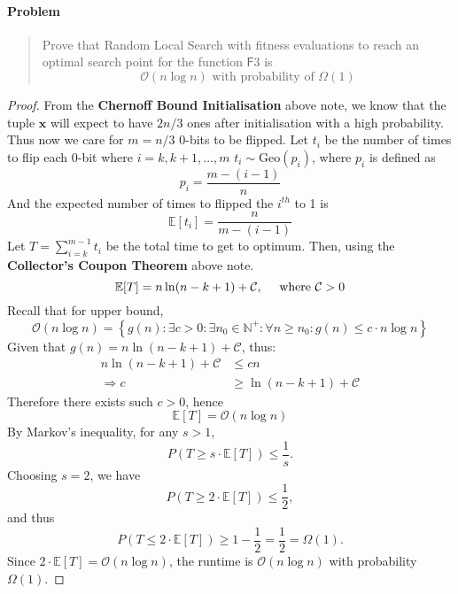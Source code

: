 \documentclass[a4paper, 12pt]{article}
\begin{document}
\paragraph{Problem}
    \begin{quote}
        Prove that Random Local Search with fitness evaluations to reach an optimal search point for the function $\mathsf{F}$3 is 
        \[
            \mathcal{O}(n\log n)
            \text{ with probability of }
            \Omega(1)
        \]
    \end{quote}
\begin{proof}
    From the \textbf{Chernoff Bound Initialisation} above note, we know that the tuple $\mathbf{x}$ will expect to have $2n/3$ ones after initialisation
    with a high probability. Thus now we care for $m = n/3$ 0-bits to be flipped. Let $t_i$ be the number of times to flip each 0-bit where $i = k,k+1,\ldots,m$
    $t_i\sim\text{Geo}(p_i)$, where $p_i$ is defined as
    \begin{equation*}
        p_i = \frac{m - (i-1)}{n}
    \end{equation*}
    And the expected number of times to flipped the $i^{th}$ to 1 is 
    \begin{equation*}
        \mathbb{E}[t_i] = \frac{n}{m - (i-1)}
    \end{equation*}
    Let $T = \sum_{i=k}^{m-1}t_i$ be the total time to get to optimum. Then, using the \textbf{Collector's Coupon Theorem} above note.
    \begin{equation*}
        \mathbb{E}[T] = n\ln(n-k+1) + \mathcal{C},\quad\text{ where $\mathcal{C} > 0$}\\
    \end{equation*}
    Recall that for upper bound,
    \begin{equation*}
        \mathcal{O}(n\log n) = \left\{g(n): \exists c>0: \exists n_0\in\mathbb{N}^+: \forall n\geq n_0: g(n)\leq c\cdot n\log n\right\}
    \end{equation*}
    Given that $g(n) =  n\ln(n-k+1) + \mathcal{C}$, thus:
    \begin{align*}
        n\ln(n-k+1) + \mathcal{C} &\leq cn\\
        \Rightarrow c&\geq\ln(n-k+1) + \mathcal{C}
    \end{align*}
    Therefore there exists such $c>0$, hence
    \begin{equation*}
        \mathbb{E}[T] = \mathcal{O}(n\log n)
    \end{equation*}
    By Markov's inequality, for any $s > 1$,
    \begin{equation*}
        P(T \geq s \cdot \mathbb{E}[T]) \leq \frac{1}{s}.
    \end{equation*}
    Choosing $s = 2$, we have
    \begin{equation*}
        P(T \geq 2 \cdot \mathbb{E}[T]) \leq \frac{1}{2},
    \end{equation*}
    and thus
    \begin{equation*}
        P(T \leq 2 \cdot \mathbb{E}[T]) \geq 1 - \frac{1}{2} = \frac{1}{2} = \Omega(1).
    \end{equation*}
    Since $2 \cdot \mathbb{E}[T] = \mathcal{O}(n \log n)$, the runtime is $\mathcal{O}(n \log n)$ with probability $\Omega(1)$.
\end{proof}
\end{document}

